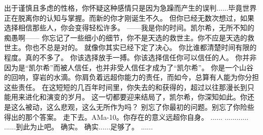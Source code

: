 \documentclass[openany]{book}
\begin{document}
\begin{dialogue}
     出于谨慎且多虑的性格，你怀疑这种感情只是因为急躁而产生的误判......毕竟世界正在脱离你的认知与掌握。而新的你才刚诞生不久。
     但你已经无数次想过，如果选择相信那些人，你会变得轻松许多。
     ——我是你的时间。凯尔希，无所不知的痴愚啊——
     你忘记了一些细小的细节，你不是天选的救世主。你不应是天选的救世主。你也不总是对的。
     就像你其实已经下定了决心。
     你比谁都清楚时间有限的程度。真的不多了。
     你该选择放手一搏。你该选择信任你可以信任的人。
     你并非因为是“凯尔希”而被人信任，也并非受人信任才成为了“凯尔希”。
     你是一个山谷的回响，穿岩的水滴。你肩负着远超你能力的责任，而如今，总算有人能为你分担这些责任。
     在这短短的几百年时间里，你失去的和获得的，超过以往那漫长到只能用来进化和演变的岁月。
     这一切都要迎来结局了，凯尔希，你深知如此。你还是这么被动，这么悲观，这么无所作为吗？
     别忘了你最初的问题。别忘了你险些得出的那个答案。
     走下去。AMa-10。你存在的意义远超你自身。
     ......
     ............
     ......到此为止吧。
     确实。
     确实......足够了。
     ......
\end{dialogue}
\end{document}
